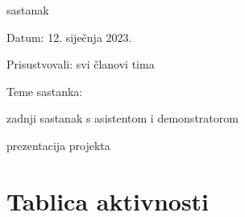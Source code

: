 \begin{packed_enum}
                \item  sastanak
			\item[] \begin{packed_item}
				\item Datum: 12. siječnja 2023.
				\item Prisustvovali: svi članovi tima
				\item Teme sastanka:
				\begin{packed_item} 
                        \item  zadnji sastanak s asistentom i demonstratorom
                        \item  prezentacija projekta
				\end{packed_item}
			\end{packed_item}
			
			
		\end{packed_enum}
		
		\eject
		\section*{Tablica aktivnosti}

